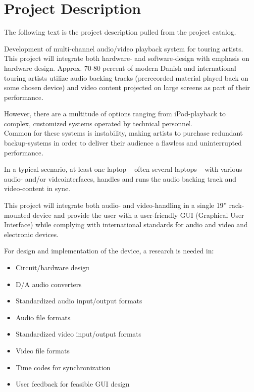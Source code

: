 \chapter{Project Description}
The following text is the project description pulled from the project catalog. \newline

Development of multi-channel audio/video playback system for touring artists. This project will
integrate both hardware- and software-design with emphasis on hardware design.
Approx. 70-80 percent of modern Danish and international touring artists utilize audio backing tracks
(prerecorded material played back on some chosen device) and video content projected on large
screens as part of their performance. \newline

However, there are a multitude of options ranging from iPod-playback to complex, customized
systems operated by technical personnel. \\
Common for these systems is instability, making artists to purchase redundant backup-systems in
order to deliver their audience a flawless and uninterrupted performance. \newline

In a typical scenario, at least one laptop – often several laptops – with various audio- and/or videointerfaces, handles and runs the audio backing track and video-content in sync. \newline

This project will integrate both audio- and video-handling in a single 19” rack-mounted device and
provide the user with a user-friendly GUI (Graphical User Interface) while complying with
international standards for audio and video and electronic devices. \newline

For design and implementation of the device, a research is needed in: \\

\begin{itemize}
\item Circuit/hardware design
\item D/A audio converters
\item Standardized audio input/output formats
\item Audio file formats
\item Standardized video input/output formats
\item Video file formats
\item Time codes for synchronization
\item User feedback for feasible GUI design
\end{itemize}

